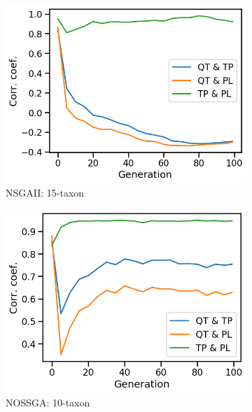 \begin{figure}[!htbp]
\begin{adjustwidth}{-1cm}{-1cm}
\begin{subfigure}[b]{0.4\textwidth}
			\includegraphics[width=\textwidth]{Figure/15-taxon_NSGAII_corr_plot}
			\caption{NSGAII: 15-taxon}
		\end{subfigure}	
		\begin{subfigure}[b]{0.4\textwidth}
			\includegraphics[width=\textwidth]{Figure/10-taxon_NOSSGA_corr_plot}
			\caption{NOSSGA: 10-taxon}
		\end{subfigure}%
		\begin{subfigure}[b]{0.4\textwidth}

\end{subfigure}
\end{adjustwidth}
\end{figure}
